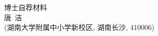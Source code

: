 \documentclass[UFT8]{ctexart}%
\begin{document}
\thispagestyle{empty} %
\vspace*{3cm}
\begin{center}
{{\LARGE\heiti 博士自荐材料}\\[0.6cm]
{\normalsize 唐\ 洁}\\[0.1cm]
{\small(湖南大学附属中小学新校区, 湖南长沙, 410006)}}
\end{center}

\clearpage%
\tableofcontents%
\thispagestyle{empty} %

\clearpage%
\setcounter{page}{1}%

%
%
%
%
%
%
%
%


%



%
%
%
%
%
%
%
%
\end{document}
